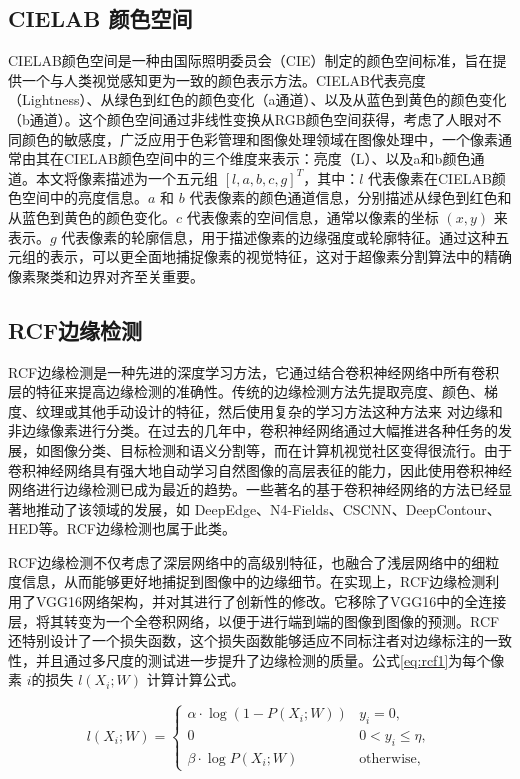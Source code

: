 \subsection{CIELAB 颜色空间}
CIELAB颜色空间是一种由国际照明委员会（CIE）制定的颜色空间标准，旨在提供一个与人类视觉感知更为一致的颜色表示方法。CIELAB代表亮度（Lightness）、从绿色到红色的颜色变化（a通道）、以及从蓝色到黄色的颜色变化（b通道）。这个颜色空间通过非线性变换从RGB颜色空间获得，考虑了人眼对不同颜色的敏感度，广泛应用于色彩管理和图像处理领域在图像处理中，一个像素通常由其在CIELAB颜色空间中的三个维度来表示：亮度（L）、以及a和b颜色通道。本文将像素描述为一个五元组 \([l, a, b, c, g]^T\)，其中：\(l\) 代表像素在CIELAB颜色空间中的亮度信息。\(a\) 和 \(b\) 代表像素的颜色通道信息，分别描述从绿色到红色和从蓝色到黄色的颜色变化。\(c\) 代表像素的空间信息，通常以像素的坐标 \((x, y)\) 来表示。\(g\) 代表像素的轮廓信息，用于描述像素的边缘强度或轮廓特征。通过这种五元组的表示，可以更全面地捕捉像素的视觉特征，这对于超像素分割算法中的精确像素聚类和边界对齐至关重要。\cite{CHTB202304007}

\subsection{RCF边缘检测}

RCF边缘检测是一种先进的深度学习方法，它通过结合卷积神经网络中所有卷积层的特征来提高边缘检测的准确性。传统的边缘检测方法先提取亮度、颜色、梯度、纹理或其他手动设计的特征，然后使用复杂的学习方法这种方法来 对边缘和非边缘像素进行分类。在过去的几年中，卷积神经网络通过大幅推进各种任务的发展，如图像分类、目标检测和语义分割等，而在计算机视觉社区变得很流行。由于卷积神经网络具有强大地自动学习自然图像的高层表征的能力，因此使用卷积神经网络进行边缘检测已成为最近的趋势。一些著名的基于卷积神经网络的方法已经显著地推动了该领域的发展，如 DeepEdge、N4-Fields、CSCNN、DeepContour、HED等。RCF边缘检测也属于此类。\cite{8100105}

RCF边缘检测不仅考虑了深层网络中的高级别特征，也融合了浅层网络中的细粒度信息，从而能够更好地捕捉到图像中的边缘细节。在实现上，RCF边缘检测利用了VGG16网络架构，并对其进行了创新性的修改。它移除了VGG16中的全连接层，将其转变为一个全卷积网络，以便于进行端到端的图像到图像的预测。RCF还特别设计了一个损失函数，这个损失函数能够适应不同标注者对边缘标注的一致性，并且通过多尺度的测试进一步提升了边缘检测的质量。公式\eqref{eq:rcf1}为每个像素 \( i \)的损失 \( l(X_i; W) \) 计算计算公式。

\begin{equation}
l(X_i; W) = \begin{cases}
\alpha \cdot \log (1 - P(X_i; W)) & y_i = 0, \\
0 & 0 < y_i \leq \eta, \\
\beta \cdot \log P(X_i; W) & \text{otherwise},
\end{cases}
  \label{eq:rcf1}
\end{equation}


